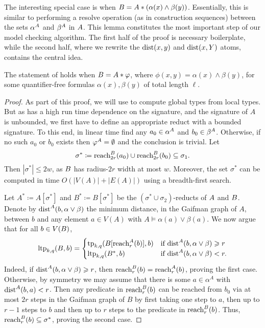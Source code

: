 The interesting special case is when ${{B}}={{A}}\ast (\alpha(x)\land \beta(y))$.
Essentially, this is similar to performing a resolve operation (as in construction sequences) between the sets $\alpha^{{A}}$ and $\beta^{{A}}$ in ${{A}}$.
This lemma constitutes the most important step of our model checking algorithm.
The first half of the proof is necessary boilerplate, while the second half, where we rewrite the \(\mathrm{dist}(x,y)\) and \(\mathrm{dist}(x,Y)\) atoms,
contains the central idea.

\begin{lemma}\label{lem:connect}
The statement of     holds when ${{B}}={{A}}\ast\varphi$,
where $\phi(x,y)=\alpha(x)\land \beta(y)$, for some quantifier-free formulas $\alpha(x),\beta(y)$ of total length $\ell$.
\end{lemma}
\begin{proof}
As part of this proof, we will use  to compute global types from local types.
But as  has a high run time dependence on the signature, and the signature of \(A\) is unbounded,
we first have to define an appropriate reduct with a bounded signature.
To this end, in linear time find any $a_0\in \alpha^{{A}}$ and $b_0\in\beta^{{A}}$.
Otherwise, if no such $a_0$ or $b_0$ exists then $\varphi^{{A}}=\emptyset$ and the conclusion is trivial.
Let $$\sigma^*\coloneqq {\rm reach}^{{{B}}}_{2r}(a_0)\cup {\rm reach}^{{{B}}}_{2r}(b_0)\subseteq \sigma_1.$$
Then $|\sigma^*|\le 2w$, as ${{B}}$ has radius-$2r$ width at most $w$.
Moreover, the set $\sigma^*$ can be computed in time \(O(|V(A)|+|E(A)|)\) using a breadth-first search.

  Let $A^*\coloneqq A[\sigma^*]$ and \(B^* \coloneqq  B[\sigma^*]\) be the $(\sigma^*\cup\sigma_2)$-reducts of ${{A}}$ and \({{B}}\).
  Denote by $\mathrm{dist}^A(b,\alpha\lor\beta)$ the minimum distance, in the Gaifman graph of $A$, between $b$ and any element $a\in V(A)$ with $A\models \alpha(a)\lor\beta(a)$.
  We now argue that for all $b\in V({{B}})$,
  \[
      \textnormal{ltp}_{k,q}({{B}},b)=\begin{cases}\textnormal{tp}_{k,q}({{B}}[{\rm reach}_r^{{A}}(b)],b)&\text{if }\mathrm{dist}^{{{A}}}(b,\alpha\lor \beta)\geqslant r\\
          \textnormal{ltp}_{k,q}(B^*,b)&\text{if }\mathrm{dist}^{{{A}}}(b,\alpha\lor \beta)< r.
      \end{cases}
  \]
  Indeed, if $\mathrm{dist}^{{{A}}}(b,\alpha\lor \beta)\geqslant r$, then ${\rm reach}_{r}^{{B}}(b)={\rm reach}_{r}^{{A}}(b)$, proving the first case.
  Otherwise,
  by symmetry we may assume that there is some \(a \in \alpha^A\) with \(\mathrm{dist}^A(b,a) < r\).
  Then any predicate in \({\rm reach}_r^{{{B}}}(b)\) can be reached from \(b_0\) via at most \(2r\) steps in the Gaifman graph of \(B\) by
  first taking one step to \(a\), then up to \(r-1\) steps to \(b\) and then up to \(r\) steps to the predicate in \({\rm reach}_r^B(b)\).
  Thus, ${\rm reach}_{r}^{{B}}(b)\subseteq \sigma^*$, proving the second case.



\end{proof}
